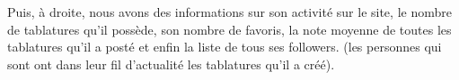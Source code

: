 Puis, à droite, nous avons des informations sur son activité sur le site, le nombre de tablatures qu'il possède, son nombre de favoris, la note moyenne de toutes les tablatures qu'il a posté et enfin la liste de tous ses followers. (les personnes qui sont ont dans leur fil d'actualité les tablatures qu'il a créé).
